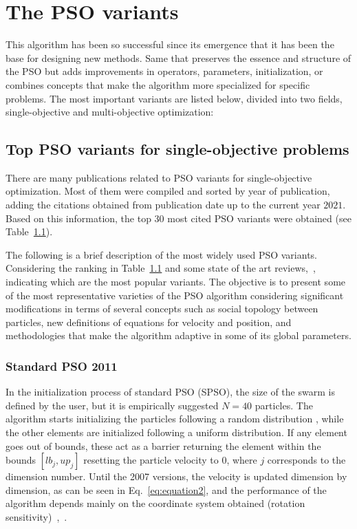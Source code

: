 \section{The PSO variants}
\label{sec:variants}

This algorithm has been so successful since its emergence that it has been the base for designing new methods. Same that preserves the essence and structure of the PSO but adds improvements in operators, parameters, initialization, or combines concepts that make the algorithm more specialized for specific problems. The most important variants are listed below, divided into two fields, single-objective and multi-objective optimization:\\ 

\subsection{Top PSO variants for single-objective problems}
\label{tab:pso_variants}
There are many publications related to PSO variants for single-objective optimization. Most of them were compiled and sorted by year of publication, adding the citations obtained from publication date up to the current year $2021$. Based on this information, the top 30 most cited PSO variants were obtained (see Table~\ref{tab:pso_variants}).




The following is a brief description of the most widely used PSO variants. Considering the ranking in Table~\ref{tab:pso_variants} and some state of the art reviews,~\cite{garcia2012brief},~\cite{sousa2017review}~\cite{sedighizadeh2009particle}~\cite{kameyama2009particle} indicating which are the most popular variants. The objective is to present some of the most representative varieties of the PSO algorithm considering significant modifications in terms of several concepts such as social topology between particles, new definitions of equations for velocity and position, and methodologies that make the algorithm adaptive in some of its global parameters.  

\subsubsection{Standard PSO 2011}

In the initialization process of standard PSO (SPSO), the size of the swarm is defined by the user, but it is empirically suggested $N=40$ particles. The algorithm starts initializing the particles following a random distribution \cite{clerc2010particle}, while the other elements are initialized following a uniform distribution. If any element goes out of bounds, these act as a barrier returning the element within the bounds $[lb_j, up_j]$ resetting the particle velocity to $0$, where $j$ corresponds to the dimension number.
Until the 2007 versions, the velocity is updated dimension by dimension, as can be seen in Eq.~\ref{eq:equation2}, and the performance of the algorithm depends mainly on the coordinate system obtained (rotation sensitivity)~\cite{clerc2012beyond},~\cite{spears2012biases}.


